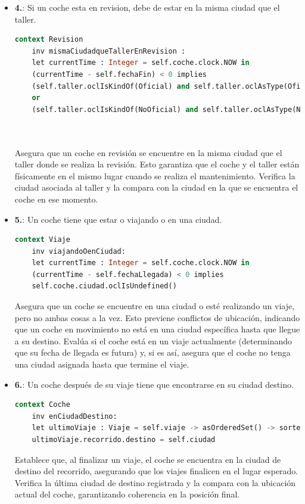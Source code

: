 \documentclass[12pt.a4paper]{article}
\begin{document}
\begin{itemize}
    \item \textbf{4.}: Si un coche esta en revision, debe de estar en la misma ciudad que el taller.
    \begin{lstlisting}[style = useEspecifico,language=SQL]
    context Revision
    inv mismaCiudadqueTallerEnRevision :
    let currentTime : Integer = self.coche.clock.NOW in   
    (currentTime - self.fechaFin) < 0 implies
    (self.taller.oclIsKindOf(Oficial) and self.taller.oclAsType(Oficial).ciudad = self.coche.ciudad) 
    or 
    (self.taller.oclIsKindOf(NoOficial) and self.taller.oclAsType(NoOficial).ciudad = self.coche.ciudad) 
        
    
\end{lstlisting}
    Asegura que un coche en revisión se encuentre en la misma ciudad que el taller donde se realiza la revisión. Esto garantiza que el coche y el taller están físicamente en el mismo lugar cuando se realiza el mantenimiento.
    Verifica la ciudad asociada al taller y la compara con la ciudad en la que se encuentra el coche en ese momento.
    
    \item \textbf{5.}: Un coche tiene que estar o viajando o en una ciudad.
    \begin{lstlisting}[style = useEspecifico,language=SQL]
  context Viaje
    inv viajandoOenCiudad:
    let currentTime : Integer = self.coche.clock.NOW in
    (currentTime - self.fechaLlegada) < 0 implies
    self.coche.ciudad.oclIsUndefined() 
    \end{lstlisting}
    Asegura que un coche se encuentre en una ciudad o esté realizando un viaje, pero no ambas cosas a la vez. Esto previene conflictos de ubicación, indicando que un coche en movimiento no está en una ciudad específica hasta que llegue a su destino.
    Evalúa si el coche está en un viaje actualmente (determinando que su fecha de llegada es futura) y, si es así, asegura que el coche no tenga una ciudad asignada hasta que termine el viaje.
    
    \item \textbf{6.}: Un coche después de su viaje tiene que encontrarse en su ciudad destino.
    \begin{lstlisting}[style = useEspecifico,language=SQL]
  context Coche
    inv enCiudadDestino:
    let ultimoViaje : Viaje = self.viaje -> asOrderedSet() -> sortedBy(fechaLlegada) -> last() in
    ultimoViaje.recorrido.destino = self.ciudad
    \end{lstlisting}
    Establece que, al finalizar un viaje, el coche se encuentra en la ciudad de destino del recorrido, asegurando que los viajes finalicen en el lugar esperado.
    Verifica la última ciudad de destino registrada y la compara con la ubicación actual del coche, garantizando coherencia en la posición final.
    

\end{itemize}
\end{document}
